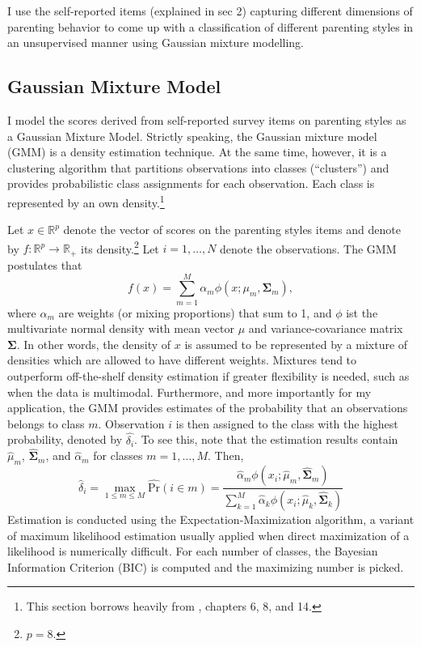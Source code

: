 I use the self-reported items (explained in sec 2) capturing different dimensions of parenting behavior to come up with a classification of different parenting styles in an unsupervised manner using Gaussian mixture modelling.
%
\subsection{Gaussian Mixture Model}
I model the scores derived from self-reported survey items on parenting styles as a Gaussian Mixture Model. Strictly speaking, the Gaussian mixture model (GMM) is a density estimation technique. At the same time, however, it is a clustering algorithm that partitions observations into classes (``clusters'') and provides probabilistic class assignments for each observation. Each class is represented by an own density.\footnote{
	This section borrows heavily from \textcite{hastieElementsStatisticalLearning2009}, chapters 6, 8, and 14.
} 

Let $x \in \mathbb{R}^p$ denote the vector of scores on the parenting styles items and denote by $f: \mathbb{R}^p \longrightarrow \mathbb{R}_{+}$ its density.\footnote{
	$p=8$.
} Let $i = 1,\ldots,N$ denote the observations. The GMM postulates that 
\begin{equation}
	f(x) = \sum_{m=1}^{M} \alpha_m \phi(x; \mu_m, \bm{\Sigma}_m),
\end{equation}
where $\alpha_m$ are weights (or mixing proportions) that sum to 1, and $\phi$ ist the multivariate normal density with mean vector $\mu$ and variance-covariance matrix $\bm{\Sigma}$. In other words, the density of $x$ is assumed to be represented by a mixture of densities which are allowed to have different weights. Mixtures tend to outperform off-the-shelf density estimation if greater flexibility is needed, such as when the data is multimodal.
Furthermore, and more importantly for my application, the GMM provides estimates of the probability that an observations belongs to class $m$. Observation $i$ is then assigned to the class with the highest probability, denoted by $\widehat{\delta_i}$. To see this, note that the estimation results contain $\widehat{\mu}_m$, $\widehat{\bm{\Sigma}}_m$, and $\widehat{\alpha}_m$ for classes $m = 1,\ldots, M$. Then,
\begin{equation*}
	\widehat{\delta}_i = \max_{1 \leqslant m \leqslant M} \widehat{\text{Pr}}(i \in m) = \frac{\widehat{\alpha}_m \phi(x_i; \widehat{\mu}_m, \widehat{\bm{\Sigma}}_m)}{\sum_{k=1}^{M} \widehat{\alpha}_k \phi(x_i; \widehat{\mu}_k, \widehat{\bm{\Sigma}}_k)}
\end{equation*}
Estimation is conducted using the Expectation-Maximization algorithm, a variant of maximum likelihood estimation usually applied when direct maximization of a likelihood is numerically difficult. For each number of classes, the Bayesian Information Criterion (BIC) is computed and the maximizing number is picked.

